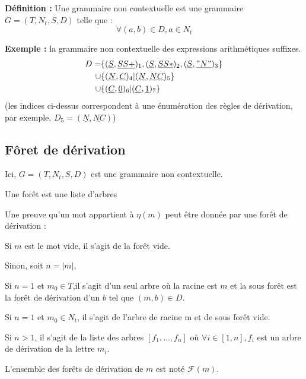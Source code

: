 \documentclass[a4paper,12pt]{article}
\newcommand{\norm}[1]{\lvert #1 \rvert}
\newlength{\mydepth}
\newlength{\myheight}
\newenvironment{answer}
{\par\begin{lrbox}{\mybox}\quad\begin{minipage}{\linewidth}\color{black}\setlength{\parskip}{10pt plus 1pt minus 1pt}\vspace*{-.7\baselineskip}}
{\end{minipage}\end{lrbox}
\settodepth{\mydepth}{\usebox{\mybox}}
\settoheight{\myheight}{\usebox{\mybox}}
\addtolength{\myheight}{\mydepth}
\noindent\makebox[0pt]{
  \color{gray}\hspace{-0pt}\rule[-\mydepth]{1pt}{\myheight}}
  \usebox{\mybox}
  }
\begin{document}
\textbf{  Définition : } Une grammaire non contextuelle est une grammaire $G = (T,N_t,S,D)$ telle que :
\begin{equation*} \forall (a,b) \in D, a \in N_t  \end{equation*}




\textbf{ Exemple : } la grammaire non contextuelle des expressions arithmétiques suffixes.
\begin{align*}
D = &\{(\underline{ S },\underline{ SS+ })_1,(\underline{ S },\underline{ SS* })_2,(\underline{ S },\underline{ "N" })_3\}\\
\cup&\{(\underline{ N },\underline{ C })_4 | (\underline{ N },\underline{ NC })_5\}\\
\cup&\{(\underline{ C },\underline{ 0 })_6 | (\underline{ C },\underline{  1 })_7\}
\end{align*}
(les indices ci-dessus correspondent à une énumération des règles de dérivation, par exemple, $D_5 = (\underline{ N },\underline{ NC })$)

\subsection{Fôret de dérivation}

Ici, $G = (T,N_t,S,D)$ est une grammaire non contextuelle.

Une forêt est une liste d'arbres


Une preuve qu'un mot appartient à $\eta(m)$ peut être donnée par une forêt de dérivation :

\begin{answer} 
Si $m$ est le mot vide, il s'agit de la forêt vide.

Sinon, soit $n = \norm{m}$,\\
\begin{answer} 
    Si $n=1$ et $m_0 \in T$,il s'agit d'un seul arbre où la racine est $m$ et la sous forêt est la forêt de dérivation d'un $b$ tel que $(m,b) \in D$.

    Si $n=1$ et $m_0 \in N_t$, il s'agit de l'arbre de racine m et de sous forêt vide.

    Si $n>1$, il s'agit de la liste des arbres $[f_1, \dots, f_n]$ où $\forall i \in [1,n], f_i$ est un arbre de dérivation de la lettre $m_i$.
\end{answer}
\end{answer}




L'ensemble des forêts de dérivation de $m$ est noté $\mathcal{F}(m)$.
\end{document}
